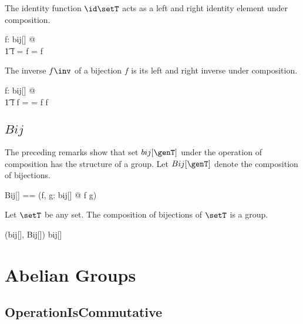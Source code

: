\documentclass{amsart}
\begin{document}
\begin{remark}
The identity function $\id \setT$ acts as a left and right identity element under composition.

\begin{zed}
	\forall f: bij[\setT] @ \\
	\t1	 \id \setT \circ f = f = f \circ \id \setT
\end{zed}

\end{remark}

\begin{remark}
The inverse $f \inv$ of a bijection $f$ is its left and right inverse under composition.

\begin{zed}
	\forall f: bij[\setT] @ \\
	\t1	f \circ f \inv = \id \setT = f \inv \circ f
\end{zed}

\end{remark}

\subsection{$Bij$}

The preceding remarks show that set $bij[\genT]$ under the operation of composition has the structure of a group.
Let $Bij[\genT]$ denote the composition of bijections.

\begin{zed}
	Bij[\genT] == (\lambda f, g: bij[\genT] @ f \circ g)
\end{zed}

\begin{example}
Let $\setT$ be any set.
The composition of bijections of $\setT$ is a group.

\begin{zed}
(bij[\setT], Bij[\setT]) \in \group bij[\setT]
\end{zed}

\end{example}

\section{Abelian Groups}

\subsection{OperationIsCommutative}
\end{document}
